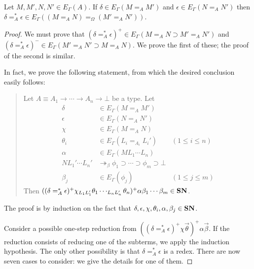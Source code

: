 \begin{lemma}
Let $M, M', N, N' \in E_\Gamma(A)$.
If $\delta \in E_\Gamma(M =_A M')$ and $\epsilon \in E_\Gamma(N =_A N')$ then
$\delta =_A^* \epsilon \in E_\Gamma((M =_A N) =_\Omega (M' =_A N'))$.
\end{lemma}

\begin{proof}
We must prove that $(\delta =_A^* \epsilon)^+ \in E_\Gamma(M =_A N \supset M' =_A N')$ and
$(\delta =_A^* \epsilon)^- \in E_\Gamma(M' =_A N' \supset M =_A N)$.  We prove the first of these; the proof of the second is similar.

In fact, we prove the following statement, from which the desired conclusion easily follows:

\begin{quote}
Let $A \equiv A_1 \rightarrow \cdots \rightarrow A_n \rightarrow \bot$ be a type.  Let
\begin{align*}
\delta & \in E_\Gamma(M =_A M') \\
\epsilon & \in E_\Gamma(N =_A N') \\
\chi & \in E_\Gamma(M =_A N) \\
\theta_i & \in E_\Gamma(L_i =_{A_i} L_i') & (1 \leq i \leq n) \\
\alpha & \in E_\Gamma(M L_1 \cdots L_n) \\
N L_1' \cdots L_n' & \twoheadrightarrow_\beta \phi_1 \supset \cdots \supset \phi_m \supset \bot \\
\beta_j & \in E_\Gamma(\phi_j) & (1 \leq j \leq m)
\end{align*}
Then $((\delta =_A^* \epsilon)^+ \chi_{L_1 L_1'} \theta_1 \cdots_{L_n L_n'} \theta_n)^+ \alpha \beta_1 \cdots \beta_m \in \mathbf{SN}$.
\end{quote}

The proof is by induction on the fact that $\delta, \epsilon, \chi, \theta_i, \alpha, \beta_j \in \mathbf{SN}$.

Consider a possible one-step reduction from $((\delta =_A^* \epsilon)^+ \chi \vec{\theta})^+ \alpha \vec{\beta}$.  If the reduction consists of reducing one of the subterms, we apply the induction hypothesis.  The only other possibility is that $\delta =_A^* \epsilon$ is a redex.  There are now seven cases to consider: we give the details for one of them.


\end{proof}

